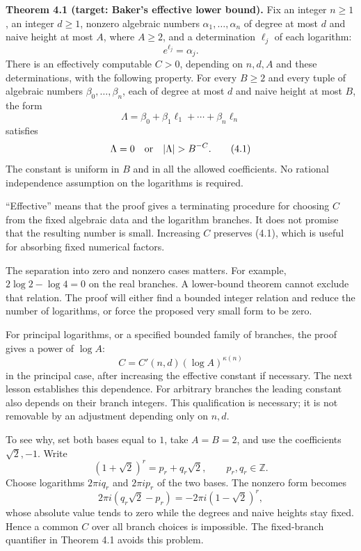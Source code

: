 \documentclass[
  11pt,
  a4paper,
]{article}
\begin{document}
\textbf{Theorem 4.1 (target: Baker's effective lower bound).} Fix an
integer \(n\ge1\), an integer \(d\ge1\), nonzero algebraic numbers
\(\alpha_1,\ldots,\alpha_n\) of degree at most \(d\) and naive height at
most \(A\), where \(A\ge2\), and a determination \(\ell_j\) of each
logarithm: \[
e^{\ell_j}=\alpha_j.
\] There is an effectively computable \(C>0\), depending on \(n,d,A\)
and these determinations, with the following property. For every
\(B\ge2\) and every tuple of algebraic numbers
\(\beta_0,\ldots,\beta_n\), each of degree at most \(d\) and naive
height at most \(B\), the form \[
\Lambda=\beta_0+\beta_1\ell_1+\cdots+\beta_n\ell_n
\] satisfies \[
\Lambda=0\quad\hbox{or}\quad |\Lambda|>B^{-C}. \tag{4.1}
\] The constant is uniform in \(B\) and in all the allowed coefficients.
No rational independence assumption on the logarithms is required.

``Effective'' means that the proof gives a terminating procedure for
choosing \(C\) from the fixed algebraic data and the logarithm branches.
It does not promise that the resulting number is small. Increasing \(C\)
preserves (4.1), which is useful for absorbing fixed numerical factors.

The separation into zero and nonzero cases matters. For example,
\(2\log2-\log4=0\) on the real branches. A lower-bound theorem cannot
exclude that relation. The proof will either find a bounded integer
relation and reduce the number of logarithms, or force the proposed very
small form to be zero.

For principal logarithms, or a specified bounded family of branches, the
proof gives a power of \(\log A\): \[
C=C'(n,d)(\log A)^{\kappa(n)} \tag{4.2}
\] in the principal case, after increasing the effective constant if
necessary. The next lesson establishes this dependence. For arbitrary
branches the leading constant also depends on their branch integers.
This qualification is necessary; it is not removable by an adjustment
depending only on \(n,d\).

To see why, set both bases equal to \(1\), take \(A=B=2\), and use the
coefficients \(\sqrt2,-1\). Write \[
(1+\sqrt2)^r=p_r+q_r\sqrt2,\qquad p_r,q_r\in\mathbb Z.
\] Choose logarithms \(2\pi iq_r\) and \(2\pi ip_r\) of the two bases.
The nonzero form becomes \[
2\pi i(q_r\sqrt2-p_r)=-2\pi i(1-\sqrt2)^r,
\] whose absolute value tends to zero while the degrees and naive
heights stay fixed. Hence a common \(C\) over all branch choices is
impossible. The fixed-branch quantifier in Theorem 4.1 avoids this
problem.
\end{document}
